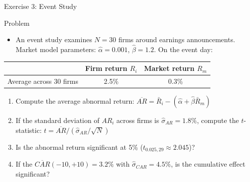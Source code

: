 \documentclass[9pt, aspectratio=169, t]{beamer}
\theoremstyle{definition}
\begin{document}
\begin{frame}{Exercise 3: Event Study}
\begin{block}{Problem}
\begin{itemize}
\item An event study examines $N = 30$ firms around earnings announcements. Market model parameters: $\hat{\alpha} = 0.001$, $\hat{\beta} = 1.2$. On the event day:
\end{itemize}
\begin{center}
{\small
\renewcommand{\arraystretch}{1.2}
\begin{tabular}{lcc}
\toprule
& \textbf{Firm return $R_i$} & \textbf{Market return $R_m$} \\
\midrule
Average across 30 firms & 2.5\% & 0.3\% \\
\bottomrule
\end{tabular}
}
\end{center}
\end{block}
\begin{enumerate}
    \item Compute the average abnormal return: $\overline{AR} = \bar{R}_i - (\hat{\alpha} + \hat{\beta}\bar{R}_m)$
    \item If the standard deviation of $AR_i$ across firms is $\hat{\sigma}_{AR} = 1.8\%$, compute the $t$-statistic: $t = \overline{AR} / (\hat{\sigma}_{AR}/\sqrt{N})$
    \item Is the abnormal return significant at 5\% ($t_{0.025, 29} \approx 2.045$)?
    \item If the $\overline{CAR}(-10, +10) = 3.2\%$ with $\hat{\sigma}_{CAR} = 4.5\%$, is the cumulative effect significant?
\end{enumerate}
\end{frame}
\end{document}
